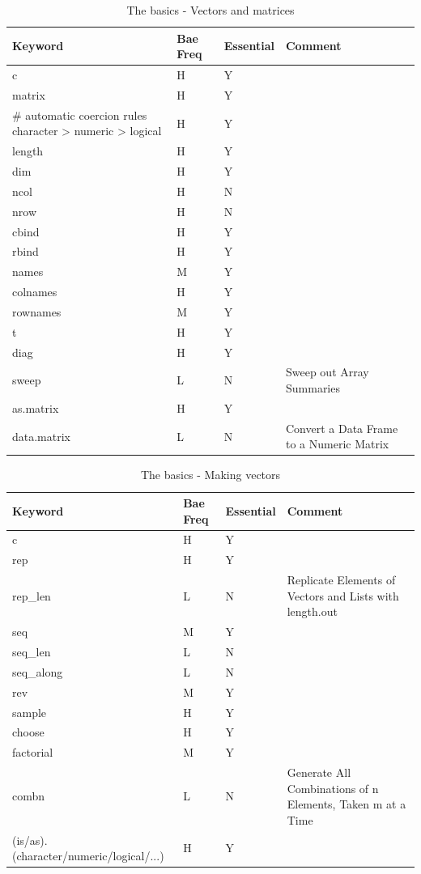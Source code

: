 \documentclass[11pt,]{krantz}
\theoremstyle{definition}
\theoremstyle{definition}
\theoremstyle{remark}
\begin{document}
\begin{table}

\caption{\label{tab:knitchunk7}The basics - Vectors and matrices}
\centering
\begin{tabular}[t]{llll}
\toprule
Keyword & Bae Freq & Essential & Comment\\
\midrule
c & H & Y & \\
matrix & H & Y & \\
\# automatic coercion rules character > numeric > logical & H & Y & \\
length & H & Y & \\
dim & H & Y & \\
\addlinespace
ncol & H & N & \\
nrow & H & N & \\
cbind & H & Y & \\
rbind & H & Y & \\
names & M & Y & \\
\addlinespace
colnames & H & Y & \\
rownames & M & Y & \\
t & H & Y & \\
diag & H & Y & \\
sweep & L & N & Sweep out Array Summaries\\
\addlinespace
as.matrix & H & Y & \\
data.matrix & L & N & Convert a Data Frame to a Numeric Matrix\\
\bottomrule
\end{tabular}
\end{table}

\begin{table}

\caption{\label{tab:knitchunk8}The basics - Making vectors }
\centering
\begin{tabular}[t]{llll}
\toprule
Keyword & Bae Freq & Essential & Comment\\
\midrule
c & H & Y & \\
rep & H & Y & \\
rep\_len & L & N & Replicate Elements of Vectors and Lists with length.out\\
seq & M & Y & \\
seq\_len & L & N & \\
\addlinespace
seq\_along & L & N & \\
rev & M & Y & \\
sample & H & Y & \\
choose & H & Y & \\
factorial & M & Y & \\
\addlinespace
combn & L & N & Generate All Combinations of n Elements, Taken m at a Time\\
(is/as).(character/numeric/logical/...) & H & Y & \\
\bottomrule
\end{tabular}
\end{table}
\end{document}
